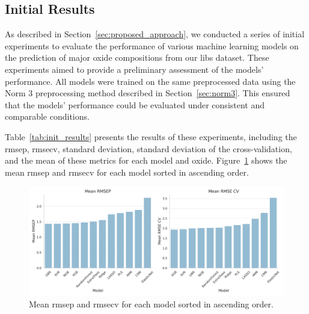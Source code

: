 \subsection{Initial Results}
As described in Section~\ref{sec:proposed_approach}, we conducted a series of initial experiments to evaluate the performance of various machine learning models on the prediction of major oxide compositions from our \gls{libs} dataset.
These experiments aimed to provide a preliminary assessment of the models' performance.
All models were trained on the same preprocessed data using the Norm 3 preprocessing method described in Section~\ref{sec:norm3}.
This ensured that the models' performance could be evaluated under consistent and comparable conditions.

Table~\ref{tab:init_results} presents the results of these experiments, including the \gls{rmsep}, \gls{rmsecv}, standard deviation, standard deviation of the cross-validation, and the mean of these metrics for each model and oxide.
Figure~\ref{fig:init_results_rmses} shows the mean \gls{rmsep} and \gls{rmsecv} for each model sorted in ascending order.

\begin{figure}[h]
    \centering
    \includegraphics[width=\textwidth]{images/init_results_rmses.png}
    \caption{Mean \gls{rmsep} and \gls{rmsecv} for each model sorted in ascending order.}
    \label{fig:init_results_rmses}
\end{figure}

